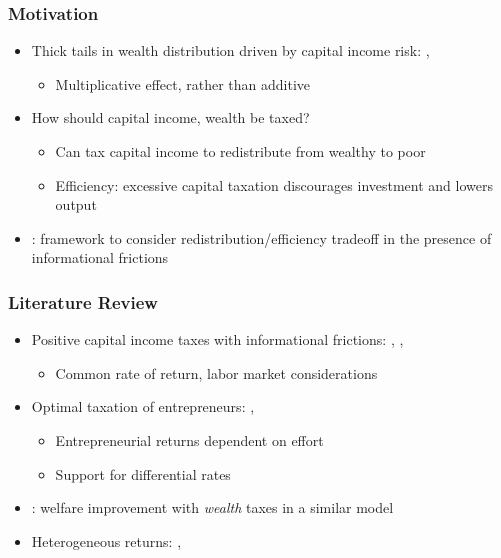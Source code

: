\documentclass{beamer}
\begin{document}
\begin{frame}
    \frametitle{Motivation}

    \begin{itemize}
        \item Thick tails in wealth distribution driven by capital income risk: \cite{benhabib2011distribution}, \cite{benhabib2019wealth} 
        \begin{itemize}
            \item Multiplicative effect, rather than additive
        \end{itemize}
        \item How should capital income, wealth be taxed? 
        \begin{itemize}
            \item Can tax capital income to redistribute from wealthy to poor 
            \item Efficiency: excessive capital taxation discourages investment and lowers output
        \end{itemize} 
        \item \cite{mirrlees1971exploration}: framework to consider redistribution/efficiency tradeoff in the presence of informational frictions 
    \end{itemize}

\end{frame}

\begin{frame}
    \frametitle{Literature Review}

    \begin{itemize}
        \item Positive capital income taxes with informational frictions: \cite{golosov2003optimal}, \cite{kocherlakota2005zero}, \cite{albanesi2006dynamic}
        \begin{itemize}
            \item Common rate of return, labor market considerations
        \end{itemize} 
        \item Optimal taxation of entrepreneurs: \cite{albanesi2006optimal}, \cite{scheuer2014entrepreneurial}
        \begin{itemize}
            \item Entrepreneurial returns dependent on effort
            \item Support for differential rates 
        \end{itemize}
        \item \cite{guvenen2019use}: welfare improvement with \textit{wealth} taxes in a similar model
        \item Heterogeneous returns: \cite{shourideh2014optimal}, \cite{gerritsen2020optimal}
    \end{itemize}

\end{frame}
\end{document}
